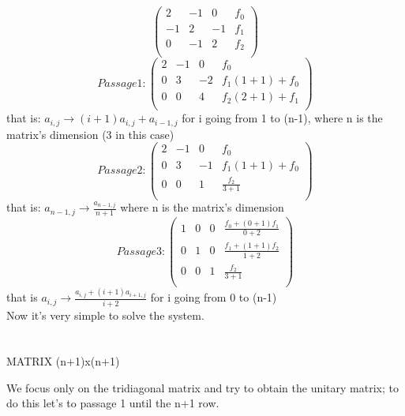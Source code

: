 \documentclass {article}
\begin{document}
\begin{equation}
\left(
\begin{array}{ccc|c}
   2 & -1 & 0 & f_0 \\
   -1 & 2 & -1 & f_1 \\
   0 & -1 & 2 & f_2 \\
\end{array}    
\right)
\end{equation}
\begin{equation}
Passage 1:
\left(
\begin{array}{ccc|c}
   2 & -1 & 0 & f_0 \\
   0 & 3 & -2 & f_1(1+1)+f_0 \\
   0 & 0 & 4 & f_2(2+1)+f_1 \\
\end{array}
\right)
\end{equation}
that is: $a_{i,j} \rightarrow (i+1)a_{i,j}+a_{i-1,j}$ for i going from 1 to (n-1), where n is the matrix's dimension (3 in this case)
\begin{equation}
Passage 2:
\left(
\begin{array}{ccc|c}
  2 & -1 & 0 & f_0 \\
  0 & 3 & -1 & f_1(1+1)+f_0 \\
  0 & 0 & 1 & \frac{f_2}{3+1}\\ 
\end{array}
\right)
\end{equation}
that is: $a_{n-1,j} \rightarrow \frac{a_{n-1,j}}{n+1}$ where n is the matrix's dimension
\begin{equation}
Passage 3:
\left(
\begin{array}{ccc|c}
  1 & 0 & 0 & \frac{f_0+(0+1)f_1}{0+2} \\
  0 & 1 & 0 & \frac{f_1+(1+1)f_2}{1+2} \\
  0 & 0 & 1 & \frac{f_2}{3+1} \\
\end{array}
\right)
\end{equation}
that is $a_{i,j} \rightarrow \frac{a_{i,j}+(i+1)a_{i+1,j}}{i+2}$ for i going from 0 to (n-1)
\\
Now it's very simple to solve the system.
\\
\\
\\
MATRIX (n+1)x(n+1)

We focus only on the tridiagonal matrix and try to obtain the unitary matrix; to do this let's to passage 1 until the n+1 row.
\end{document}
